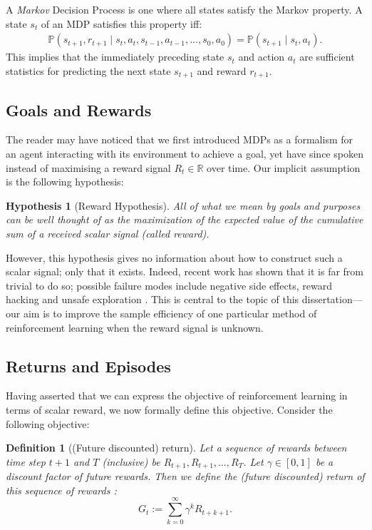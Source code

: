 \documentclass[11pt, a4paper, bibliography=totoc]{report}
\newcommand{\reals}{\mathbb{R}}
\renewcommand{\P}[1]{\mathbb{P}\left( #1 \right) }
\newtheorem{hypothesis}{Hypothesis}
\newtheorem{definition}{Definition}
\begin{document}
A \textit{Markov} Decision Process is one where all states satisfy the Markov property. A state $ s_t $ of an MDP satisfies this property iff:
\begin{align*}
\P{s_{t+1}, r_{t+1} \mid s_t, a_t, s_{t-1}, a_{t-1}, \dots, s_0, a_0 } = \P{s_{t+1} \mid s_t, a_t}.
\end{align*}
This implies that the immediately preceding state $ s_t $ and action $ a_t $ are sufficient statistics for predicting the next state $ s_{t+1} $ and reward $ r_{t+1} $.

\subsection{Goals and Rewards}
The reader may have noticed that we first introduced MDPs as a formalism for an agent interacting with its environment to achieve a goal, yet have since spoken instead of maximising a reward signal $ R_t \in \reals $ over time. Our implicit assumption is the following hypothesis:
\begin{hypothesis}[Reward Hypothesis]
\textit{All of what we mean by goals and purposes can be well thought of as the maximization of the expected value of the cumulative sum of a received scalar signal (called reward).} \cite[p.~53]{Sutton2018}
\end{hypothesis}
However, this hypothesis gives no information about how to construct such a scalar signal; only that it exists. Indeed, recent work has shown that it is far from trivial to do so; possible failure modes include negative side effects, reward hacking and unsafe exploration \cite{Amodei2016}. This is central to the topic of this dissertation---our aim is to improve the sample efficiency of one particular method of reinforcement learning when the reward signal is unknown.

\subsection{Returns and Episodes}
Having asserted that we can express the objective of reinforcement learning in terms of scalar reward, we now formally define this objective. Consider the following objective:
\begin{definition}[(Future discounted) return]
Let a sequence of rewards between time step $ t + 1 $ and $ T $ (inclusive) be $ R_{t+1}, R_{t+1}, \dots, R_T $. Let $ \gamma \in [0, 1] $ be a discount factor of future rewards. Then we define the (future discounted) return of this sequence of rewards \cite[p.~57]{Sutton2018}:
\begin{equation} \label{G_t}
G_t := \sum_{k=0}^{\infty} \gamma^k R_{t+k+1}.
\end{equation}
\end{definition}
\end{document}
